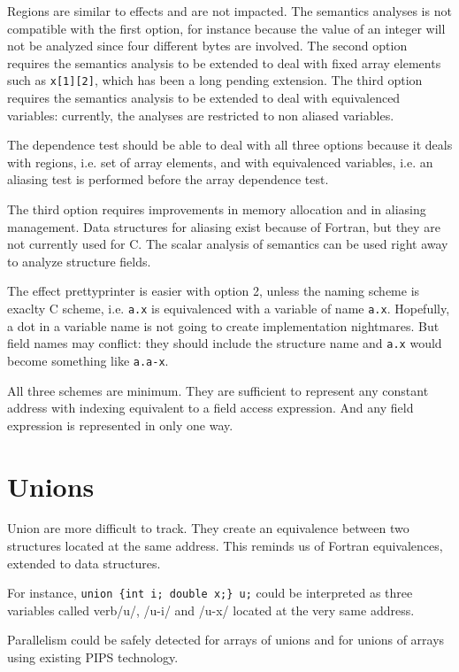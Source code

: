 \documentclass[a4paper]{report}
\begin{document}
Regions are similar to effects and are not impacted. The semantics
 analyses is not compatible with the first option, for instance
 because the value of an integer will not be analyzed since four
 different bytes are involved. The second option requires the
 semantics analysis to be extended to deal with fixed array elements
 such as \verb/x[1][2]/, which has been a long pending extension. The
 third option requires the semantics analysis to be extended to deal
 with equivalenced variables: currently, the analyses are restricted
 to non aliased variables.

The dependence test should be able to deal with all three options
 because it deals with regions, i.e. set of array elements, and with
 equivalenced variables, i.e. an aliasing test is performed before the
 array dependence test.

The third option requires improvements in memory allocation and in
 aliasing management. Data structures for aliasing exist because of
 Fortran, but they are not currently used for C. The scalar analysis
 of semantics can be used right away to analyze structure fields.

The effect prettyprinter is easier with option 2, unless the naming
 scheme is exaclty C scheme, i.e. \verb/a.x/ is equivalenced with a
 variable of name \verb/a.x/. Hopefully, a dot in a variable name is
 not going to create implementation nightmares. But field names may
 conflict: they should include the structure name and \verb/a.x/ would
 become something like \verb/a.a-x/.

All three schemes are minimum. They are sufficient to represent any
 constant address with indexing equivalent to a field access
 expression. And any field expression is represented in only one way.

\section{Unions}
\label{section:unions}

Union are more difficult to track. They create an equivalence between
 two structures located at the same address. This reminds us of
 Fortran equivalences, extended to data structures.

For instance, \verb/union {int i; double x;} u;/ could be interpreted
 as three variables called verb/u/, /u-i/ and /u-x/ located at the very same
 address.

Parallelism could be safely detected for arrays of unions and for unions of
 arrays using existing PIPS technology.
\end{document}
